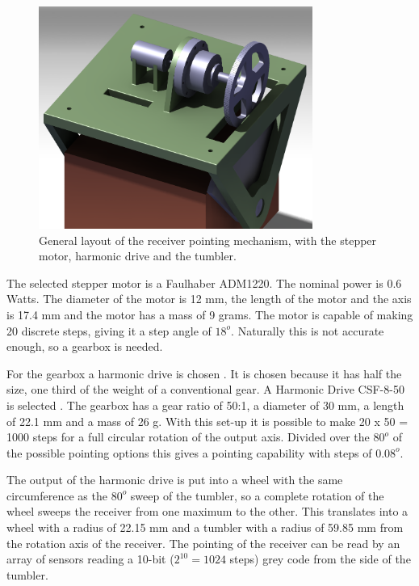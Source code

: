 \begin{figure} [h]
\centering
\includegraphics[width=0.8\textwidth, bb=0 0 895px 756px]{chapters/img/point_setup.png}
\caption[General layout of the receiver pointing mechanism]{General layout of the receiver pointing mechanism, with the stepper motor, harmonic drive and the tumbler.}
\label{fig:point}
\end{figure}

The selected stepper motor is a Faulhaber ADM1220. The nominal power is 0.6 Watts. The diameter of the motor is 12 mm, the length of the motor and the axis is 17.4 mm and the motor has a mass of 9 grams. The motor is capable of making 20 discrete steps, giving it a step angle of $18^o$. Naturally this is not accurate enough, so a gearbox is needed.

For the gearbox a harmonic drive is chosen \cite{harmonicdrive}. It is chosen because it has half the size, one third of the weight of a conventional gear. A Harmonic Drive CSF-8-50 is selected \cite{harmweb}. The gearbox has a gear ratio of 50:1, a diameter of 30 mm, a length of 22.1 mm and a mass of 26 g. With this set-up it is possible to make 20 x 50 = 1000 steps for a full circular rotation of the output axis. Divided over the $80^o$ of the possible pointing options this gives a pointing capability with steps of $0.08^o$.

The output of the harmonic drive is put into a wheel with the same circumference as the $80^o$ sweep of the tumbler, so a complete rotation of the wheel sweeps the receiver from one maximum to the other. This translates into a wheel with a radius of 22.15 mm and a tumbler with a radius of 59.85 mm from the rotation axis of the receiver. The pointing of the receiver can be read by an array of sensors reading a 10-bit ($2^10 = 1024$ steps) grey code from the side of the tumbler.
